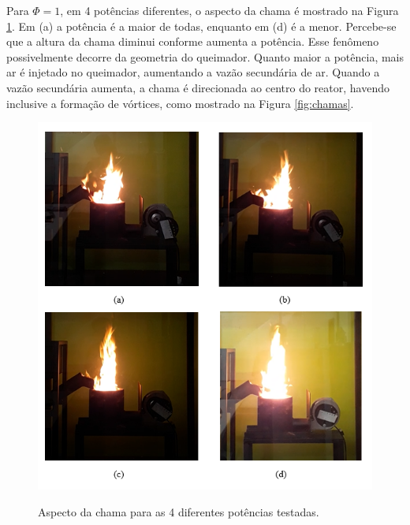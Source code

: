 Para $\Phi = 1$, em 4 potências diferentes, o aspecto da chama é mostrado na Figura \ref{fig:4chamasphi1}. Em (a) a potência é a maior de todas, enquanto em (d) é a menor. Percebe-se que a altura da chama diminui conforme aumenta a potência. Esse fenômeno possivelmente decorre da geometria do queimador. Quanto maior a potência, mais ar é injetado no queimador, aumentando a vazão secundária de ar. Quando a vazão secundária aumenta, a chama é direcionada ao centro do reator, havendo inclusive a formação de vórtices, como mostrado na Figura \ref{fig:chamas}.

\begin{figure}[!ht]
    \centering
	\caption{Aspecto da chama para as 4 diferentes potências testadas.}
	\includegraphics[scale=1]{Textuais/results/4chamas.png}
	\label{fig:4chamasphi1}
\end{figure}

